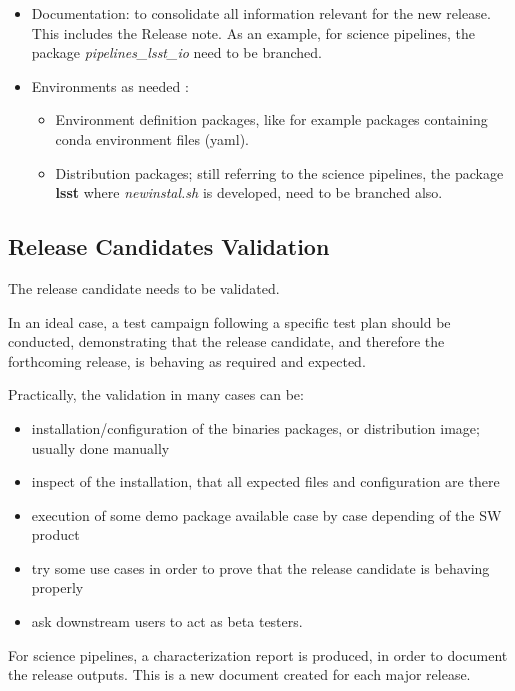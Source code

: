 \begin{itemize}
\item Documentation: to consolidate all information relevant for the new release. This includes the Release note. 
As an example, for science pipelines, the package \textit{pipelines\_lsst\_io} need to be branched.
\item Environments as needed :
	\begin{itemize}
	\item  Environment definition packages, like for example packages containing conda environment files (yaml).
	\item  Distribution packages; still referring to the science pipelines, the package {\bf lsst}  where \textit{newinstal.sh} is developed, need to be branched also.
	\end{itemize}
\end{itemize}


\subsection{Release Candidates Validation} \label{sec:rcvalidation}

The release candidate needs to be validated.

In an ideal case, a test campaign following a specific test plan should be conducted, demonstrating that the release candidate, and therefore the forthcoming release, is behaving as required and expected.

Practically, the validation in many cases can be:

\begin{itemize}
\item installation/configuration of the binaries packages, or distribution image; usually done manually
\item inspect of the installation, that all expected files and configuration are there
\item execution of some demo package available case by case depending of the SW product
\item try some use cases in order to prove that the release candidate is behaving properly
\item ask downstream users to act as beta testers.
\end{itemize}

For science pipelines, a characterization report is produced, in order to document the release outputs.
This is a new document created for each major release.


